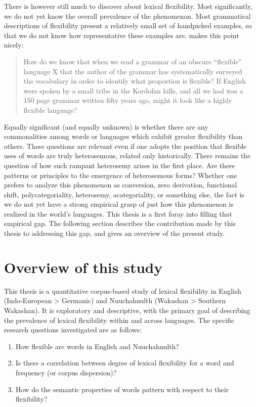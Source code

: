 There is however still much to discover about lexical flexibility. Most significantly, we do not yet know the overall prevalence of the phenomenon. Most grammatical descriptions of flexibility present a relatively small set of handpicked examples, so that we do not know how representative these examples are. \textcite[70]{Croft2001} makes this point nicely:

\blockquote[{\cite[70]{Croft2001}}]{How do we know that when we read a grammar of an obscure \enquote{flexible} language X that the author of the grammar has systematically surveyed the vocabulary in order to identify what proportion is flexible? If English were spoken by a small tribe in the Kordofan hills, and all we had was a 150 page grammar written fifty years ago, might it look like a highly flexible language?}

\noindent Equally significant (and equally unknown) is whether there are any commonalities among words or languages which exhibit greater flexibility than others. These questions are relevant even if one adopts the position that flexible uses of words are truly heterosemous, related only historically. There remains the question of how such rampant heterosemy arises in the first place. Are there patterns or principles to the emergence of heterosemous forms? Whether one prefers to analyze this phenomenon as conversion, zero derivation, functional shift, polycategoriality, heterosemy, acategoriality, or something else, the fact is we do not yet have a strong empirical grasp of just how this phenomenon is realized in the world's languages. This thesis is a first foray into filling that empirical gap. The following section describes the contribution made by this thesis to addressing this gap, and gives an overview of the present study.

\section{Overview of this study}
\label{sec:1.3}

This thesis is a quantitative corpus-based study of lexical flexibility in English (Indo-European > Germanic) and Nuuchahnulth (Wakashan > Southern Wakashan). It is exploratory and descriptive, with the primary goal of describing the prevalence of lexical flexibility within and across languages. The specific research questions investigated are as follows:

\begin{enumerate}[
  label      = {\textbf{R\arabic*:}},
  leftmargin = *,
  ref        = {R\arabic*}
]
  \item\label{R1} How flexible are words in English and Nuuchahnulth?
  \item\label{R2} Is there a correlation between degree of lexical flexibility for a word and frequency (or corpus dispersion)?
  \item\label{R3} How do the semantic properties of words pattern with respect to their flexibility?
\end{enumerate}

